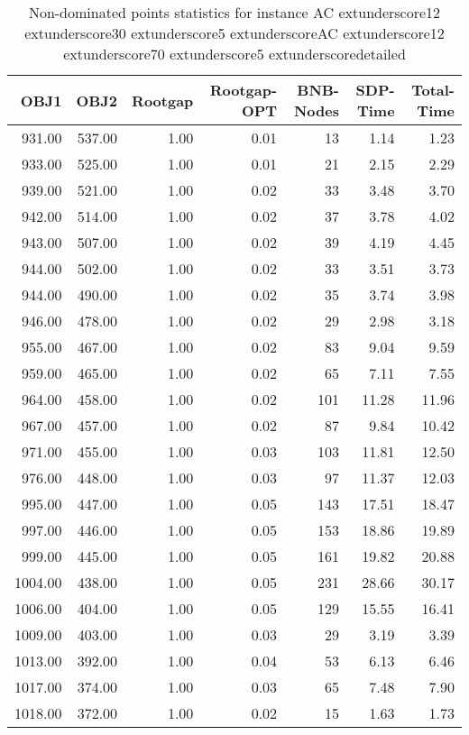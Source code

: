 \begin{table}
\caption{Non-dominated points statistics for instance AC	extunderscore12	extunderscore30	extunderscore5	extunderscoreAC	extunderscore12	extunderscore70	extunderscore5	extunderscoredetailed}
\label{tab:plots/AC_12_30_5_AC_12_70_5_detailed}
\begin{tabular}{rrrrrrr}
\toprule
OBJ1 & OBJ2 & Rootgap & Rootgap-OPT & BNB-Nodes & SDP-Time & Total-Time \\
\midrule
931.00 & 537.00 & 1.00 & 0.01 & 13 & 1.14 & 1.23 \\
933.00 & 525.00 & 1.00 & 0.01 & 21 & 2.15 & 2.29 \\
939.00 & 521.00 & 1.00 & 0.02 & 33 & 3.48 & 3.70 \\
942.00 & 514.00 & 1.00 & 0.02 & 37 & 3.78 & 4.02 \\
943.00 & 507.00 & 1.00 & 0.02 & 39 & 4.19 & 4.45 \\
944.00 & 502.00 & 1.00 & 0.02 & 33 & 3.51 & 3.73 \\
944.00 & 490.00 & 1.00 & 0.02 & 35 & 3.74 & 3.98 \\
946.00 & 478.00 & 1.00 & 0.02 & 29 & 2.98 & 3.18 \\
955.00 & 467.00 & 1.00 & 0.02 & 83 & 9.04 & 9.59 \\
959.00 & 465.00 & 1.00 & 0.02 & 65 & 7.11 & 7.55 \\
964.00 & 458.00 & 1.00 & 0.02 & 101 & 11.28 & 11.96 \\
967.00 & 457.00 & 1.00 & 0.02 & 87 & 9.84 & 10.42 \\
971.00 & 455.00 & 1.00 & 0.03 & 103 & 11.81 & 12.50 \\
976.00 & 448.00 & 1.00 & 0.03 & 97 & 11.37 & 12.03 \\
995.00 & 447.00 & 1.00 & 0.05 & 143 & 17.51 & 18.47 \\
997.00 & 446.00 & 1.00 & 0.05 & 153 & 18.86 & 19.89 \\
999.00 & 445.00 & 1.00 & 0.05 & 161 & 19.82 & 20.88 \\
1004.00 & 438.00 & 1.00 & 0.05 & 231 & 28.66 & 30.17 \\
1006.00 & 404.00 & 1.00 & 0.05 & 129 & 15.55 & 16.41 \\
1009.00 & 403.00 & 1.00 & 0.03 & 29 & 3.19 & 3.39 \\
1013.00 & 392.00 & 1.00 & 0.04 & 53 & 6.13 & 6.46 \\
1017.00 & 374.00 & 1.00 & 0.03 & 65 & 7.48 & 7.90 \\
1018.00 & 372.00 & 1.00 & 0.02 & 15 & 1.63 & 1.73 \\

\end{tabular}
\end{table}

